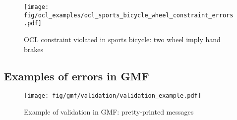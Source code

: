 \begin{figure}[H]
    \begin{center}
        \texttt{[image: fig/ocl\_examples/ocl\_sports\_bicycle\_wheel\_constraint\_errors.pdf]}
        \caption{OCL constraint violated in sports bicycle: two wheel imply
        hand brakes}
        \label{fig.ocl_ecore_handbreaks}
    \end{center}
\end{figure}

\subsection{Examples of errors in GMF}

\begin{figure}[H]
    \begin{center}
        \texttt{[image: fig/gmf/validation/validation\_example.pdf]}
        \caption{Example of validation in GMF: pretty-printed messages}
        \label{fig.gmf_validation}
    \end{center}
\end{figure}
